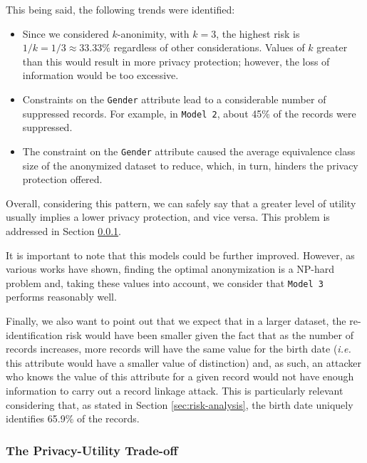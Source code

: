 \documentclass[a4paper, 11pt]{article}
\begin{document}
\pagebreak

This being said, the following trends were identified:

\begin{itemize}
    \item Since we considered $k$-anonimity, with $k=3$, the highest risk is
    $1/k = 1/3 \approx 33.33\%$ regardless of other considerations. Values of $k$ 
    greater than this would result in more privacy protection; however, the loss of 
    information would be too excessive.
    \item Constraints on the \texttt{Gender} attribute lead to a considerable 
    number of suppressed records. For example, in \texttt{Model 2}, about 45\% of 
    the records were suppressed.
    \item The constraint on the \texttt{Gender} attribute caused the average 
    equivalence class size of the anonymized dataset to reduce, which, in turn, 
    hinders the privacy protection offered.
\end{itemize}

Overall, considering this pattern, we can safely say that a greater level of 
utility usually implies a lower privacy protection, and vice versa. This 
problem is addressed in Section \ref{sec:privacy-utility-tradeoff}.

It is important to note that this models could be further improved. However, as 
various works have shown, finding the optimal anonymization is a NP-hard 
problem \cite{10.1145/1749603.1749605} and, taking these values into account, 
we consider that \texttt{Model 3} performs reasonably well.

Finally, we also want to point out that we expect that in a larger dataset, the 
re-identification risk would have been smaller given the fact that as the 
number of records increases, more records will have the same value for the 
birth date (\textit{i.e.} this attribute would have a smaller value of 
distinction) and, as such, an attacker who knows the value of this attribute 
for a given record would not have enough information to carry out a record 
linkage attack. This is particularly relevant considering that, as stated in 
Section \ref{sec:risk-analysis}, the birth date uniquely identifies 65.9\% of 
the records. 

\pagebreak

\subsubsection{The Privacy-Utility Trade-off} 
\label{sec:privacy-utility-tradeoff}
\end{document}
